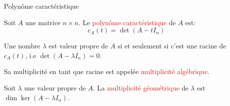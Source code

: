 
\begin{parag}{Polynôme caractéristique}
    \begin{definition}
        
    Soit $A$ une matrice $n \times n$. Le \textcolor{red}{polynôme caractéristique} de $A$ est:
    \[c_A(t) = \det (A-tI_n)\]

    \end{definition}
    \begin{theoreme}
        Une nombre $\lambda$ est valeur propre de $A$ si et seulement si c'est une racine de $c_A(t)$, i.e $\det (A - \lambda I_n) = 0$.
    \end{theoreme}
    Sa multiplicité en tant que racine est appelée \textcolor{red}{multiplicité algébrique}.
    \begin{definition}
        Soit $\lambda$ une valeur propre de $A$. La \textcolor{red}{multiplicité géométrique} de $\lambda$ est $\dim \ker (A- \lambda I_n)$.
    \end{definition}

\end{parag}



